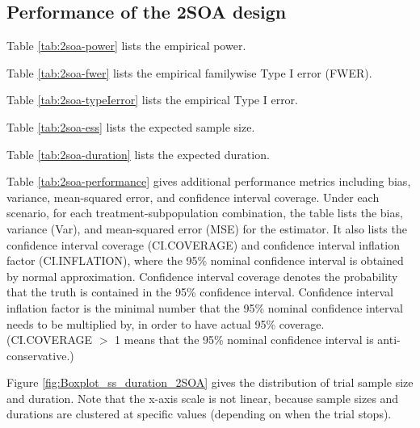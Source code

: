 \documentclass{article}\usepackage[]{graphicx}\usepackage[]{color}
\makeatletter
\newenvironment{kframe}{%
 \def\at@end@of@kframe{}%
 \ifinner\ifhmode%
  \def\at@end@of@kframe{\end{minipage}}%
  \begin{minipage}{\columnwidth}%
 \fi\fi%
 \def\FrameCommand##1{\hskip\@totalleftmargin \hskip-\fboxsep
 \colorbox{shadecolor}{##1}\hskip-\fboxsep
     \hskip-\linewidth \hskip-\@totalleftmargin \hskip\columnwidth}%
 \MakeFramed {\advance\hsize-\width
   \@totalleftmargin\z@ \linewidth\hsize
   \@setminipage}}%
 {\par\unskip\endMakeFramed%
 \at@end@of@kframe}
\numberwithin{table}{section}
\numberwithin{figure}{section}
\makeatother
\begin{document}
\subsection{Performance of the 2SOA design}


Table \ref{tab:2soa-power} lists the empirical power.

Table \ref{tab:2soa-fwer} lists the empirical familywise Type I error (FWER).

Table \ref{tab:2soa-typeIerror} lists the empirical Type I error.

Table \ref{tab:2soa-ess} lists the expected sample size.

Table \ref{tab:2soa-duration} lists the expected duration.

Table \ref{tab:2soa-performance} gives additional performance metrics including bias, variance, mean-squared error, and confidence interval coverage. Under each scenario, for each treatment-subpopulation combination, the table lists the bias, variance (Var), and mean-squared error (MSE) for the estimator. It also lists the confidence interval coverage (CI.COVERAGE) and confidence interval inflation factor (CI.INFLATION), where the 95\% nominal confidence interval is obtained by normal approximation. Confidence interval coverage denotes the probability that the truth is contained in the 95\% confidence interval. Confidence interval inflation factor is the minimal number that the 95\% nominal confidence interval needs to be multiplied by, in order to have actual 95\% coverage. (CI.COVERAGE $>$ 1 means that the 95\% nominal confidence interval is anti-conservative.)

Figure \ref{fig:Boxplot_ss_duration_2SOA} gives the distribution of trial sample size and duration. Note that the x-axis scale is not linear, because sample sizes and durations are clustered at specific values (depending on when the trial stops).

\begin{kframe}


{\ttfamily\noindent\bfseries{}}

{\ttfamily\noindent\bfseries\color{errorcolor}{\#\# Error in cbind(tsea.result\$optima\$empirical.power, tsea.result\$optima\$conj.power): object 'tsea.result' not found}}

{\ttfamily\noindent\bfseries\color{errorcolor}{\#\# Error in names(x) <- value: 'names' attribute [1] must be the same length as the vector [0]}}

{\ttfamily\noindent\bfseries\color{errorcolor}{\#\# Error in data.frame(Scenario = 1:n.scenarios, my.table): arguments imply differing number of rows: 1, 0}}\end{kframe}
\end{document}
